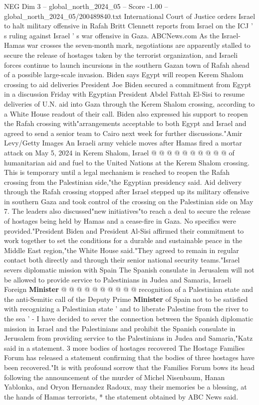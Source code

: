 \begin{textsample}{NEG Dim 3 – global\_north\_2024\_05 – Score -1.00 – global\_north\_2024\_05/200489840.txt}  \label{ex:f3_neg_442}
International Court of Justice orders Israel to halt military offensive in Rafah Britt Clennett reports from Israel on the ICJ ' s ruling against Israel ' s war offensive in Gaza.
ABCNews.com As the Israel-Hamas war crosses the seven-month mark, negotiations are apparently stalled to secure the release of hostages taken by the terrorist organization, and Israeli forces continue to launch incursions in the southern Gazan town of Rafah ahead of a possible large-scale invasion.
Biden says Egypt will reopen Kerem Shalom crossing to aid deliveries President Joe Biden secured a commitment from Egypt in a discussion Friday with Egyptian President Abdel Fattah El-Sisi to resume deliveries of U.N. aid into Gaza through the Kerem Shalom crossing, according to a White House readout of their call.
Biden also expressed his support to reopen the Rafah crossing with"arrangements acceptable to both Egypt and Israel and agreed to send a senior team to Cairo next week for further discussions."Amir Levy/Getty Images An Israeli army vehicle moves after Hamas fired a mortar attack on May 5, 2024 in Kerem Shalom, Israel @ @ @ @ @ @ @ @ @ @ of humanitarian aid and fuel to the United Nations at the Kerem Shalom crossing.
This is temporary until a legal mechanism is reached to reopen the Rafah crossing from the Palestinian side,"the Egyptian presidency said.
Aid delivery through the Rafah crossing stopped after Israel stepped up its military offensive in southern Gaza and took control of the crossing on the Palestinian side on May 7.
The leaders also discussed"new initiatives"to reach a deal to secure the release of hostages being held by Hamas and a cease-fire in Gaza.
No specifics were provided."President Biden and President Al-Sisi affirmed their commitment to work together to set the conditions for a durable and sustainable peace in the Middle East region,"the White House said."They agreed to remain in regular contact both directly and through their senior national security teams."Israel severs diplomatic mission with Spain The Spanish consulate in Jerusalem will not be allowed to provide service to Palestinians in Judea and Samaria, Israeli Foreign \textbf{Minister} @ @ @ @ @ @ @ @ @ @ recognition of a Palestinian state and the anti-Semitic call of the Deputy Prime \textbf{Minister} of Spain not to be satisfied with recognizing a Palestinian state ' and to liberate Palestine from the river to the sea ' - I have decided to sever the connection between the Spanish diplomatic mission in Israel and the Palestinians and prohibit the Spanish consulate in Jerusalem from providing service to the Palestinians in Judea and Samaria,"Katz said in a statement. 3 more bodies of hostages recovered The Hostage Families Forum has released a statement confirming that the bodies of three hostages have been recovered."It is with profound sorrow that the Families Forum bows its head following the announcement of the murder of Michel Nisenbaum, Hanan Yablonka, and Oryon Hernandez Radoux, may their memories be a blessing, at the hands of Hamas terrorists, * the statement obtained by ABC News said.

\end{textsample}
